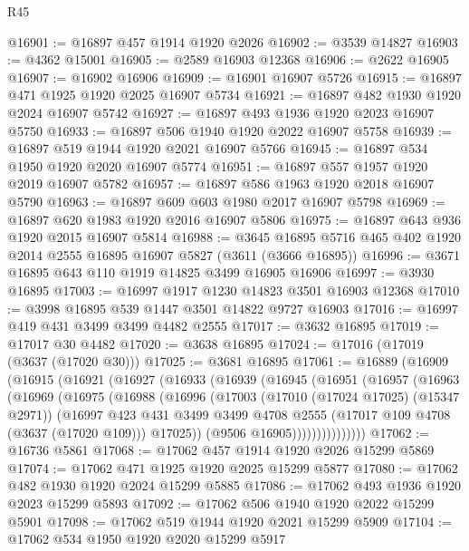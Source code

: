 \begin{lexlean}{R45}
\begin{coremodule}
@16901 := @16897 @457 @1914 @1920 @2026
@16902 := @3539 @14827
@16903 := @4362 @15001
@16905 := @2589 @16903 @12368
@16906 := @2622 @16905
@16907 := @16902 @16906
@16909 := @16901 @16907 @5726
@16915 := @16897 @471 @1925 @1920 @2025 @16907 @5734
@16921 := @16897 @482 @1930 @1920 @2024 @16907 @5742
@16927 := @16897 @493 @1936 @1920 @2023 @16907 @5750
@16933 := @16897 @506 @1940 @1920 @2022 @16907 @5758
@16939 := @16897 @519 @1944 @1920 @2021 @16907 @5766
@16945 := @16897 @534 @1950 @1920 @2020 @16907 @5774
@16951 := @16897 @557 @1957 @1920 @2019 @16907 @5782
@16957 := @16897 @586 @1963 @1920 @2018 @16907 @5790
@16963 := @16897 @609 @603 @1980 @2017 @16907 @5798
@16969 := @16897 @620 @1983 @1920 @2016 @16907 @5806
@16975 := @16897 @643 @936 @1920 @2015 @16907 @5814
@16988 := @3645 @16895 @5716 @465 @402 @1920 @2014 @2555 @16895 @16907 @5827 (@3611 (@3666 @16895))
@16996 := @3671 @16895 @643 @110 @1919 @14825 @3499 @16905 @16906
@16997 := @3930 @16895
@17003 := @16997 @1917 @1230 @14823 @3501 @16903 @12368
@17010 := @3998 @16895 @539 @1447 @3501 @14822 @9727 @16903
@17016 := @16997 @419 @431 @3499 @3499 @4482 @2555
@17017 := @3632 @16895
@17019 := @17017 @30 @4482
@17020 := @3638 @16895
@17024 := @17016 (@17019 (@3637 (@17020 @30)))
@17025 := @3681 @16895
@17061 := @16889
    (@16909
      (@16915
        (@16921
          (@16927
            (@16933
              (@16939
                (@16945
                  (@16951
                    (@16957
                      (@16963
                        (@16969
                          (@16975
                            (@16988
                              (@16996
                                (@17003
                                  (@17010 (@17024 @17025) (@15347 @2971))
                                  (@16997
                                    @423
                                    @431
                                    @3499
                                    @3499
                                    @4708
                                    @2555
                                    (@17017 @109 @4708 (@3637 (@17020 @109)))
                                    @17025))
                                (@9506 @16905)))))))))))))))
@17062 := @16736 @5861
@17068 := @17062 @457 @1914 @1920 @2026 @15299 @5869
@17074 := @17062 @471 @1925 @1920 @2025 @15299 @5877
@17080 := @17062 @482 @1930 @1920 @2024 @15299 @5885
@17086 := @17062 @493 @1936 @1920 @2023 @15299 @5893
@17092 := @17062 @506 @1940 @1920 @2022 @15299 @5901
@17098 := @17062 @519 @1944 @1920 @2021 @15299 @5909
@17104 := @17062 @534 @1950 @1920 @2020 @15299 @5917

\end{coremodule}
\end{lexlean}
